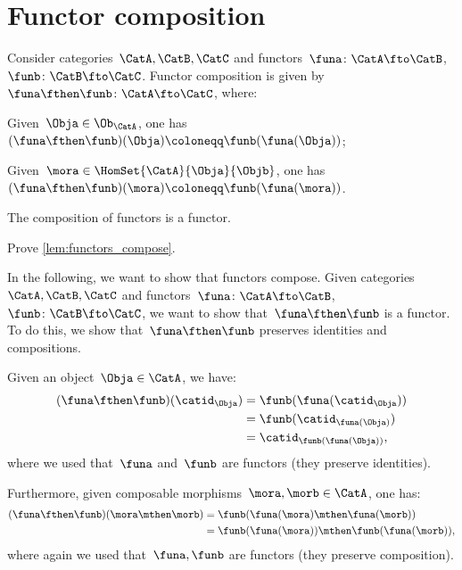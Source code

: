 \section{Functor composition}

\begin{ctdefinition}
  \label{def:functor_composition}
  Consider categories~$\CatA,\CatB,\CatC$ and functors~$\funa\colon \CatA\fto \CatB$,~$\funb \colon \CatB\fto \CatC$.
  Functor composition is given by~$\funa\fthen \funb\colon \CatA \fto \CatC$, where:
  \begin{compactitem}
    \item Given~$\Obja\in \Ob_\CatA$, one has~$(\funa\fthen \funb)(\Obja)\coloneqq\funb(\funa(\Obja))$;
    \item Given~$\mora \in \HomSet{\CatA}{\Obja}{\Objb}$, one has~$(\funa\fthen \funb)(\mora)\coloneqq \funb(\funa(\mora))$.
  \end{compactitem}
\end{ctdefinition}

\begin{lemma}
  \label{lem:functors_compose}
  The composition of functors is a functor.
\end{lemma}

\begin{exercise}
  Prove \cref{lem:functors_compose}.
\end{exercise}
\begin{solution}
  In the following, we want to show that functors compose.
Given categories~$\CatA,\CatB,\CatC$ and functors~$\funa\colon \CatA\fto \CatB$,~$\funb \colon \CatB\fto \CatC$, we want to show that~$\funa\fthen\funb$ is a functor.
  To do this, we show that~$\funa\fthen\funb$ preserves identities and compositions.
\begin{compactitem}
  \item Given an object~$\Obja\in \CatA$, we have:
  \begin{equation*}
    \begin{aligned}
    (\funa\fthen\funb)(\catid_\Obja)
      &=\funb(\funa(\catid_\Obja))\\
      &=\funb(\catid_{\funa(\Obja)})\\
      &=\catid_{\funb(\funa(\Obja))},
    \end{aligned}
  \end{equation*}
  where we used that~$\funa$ and~$\funb$ are functors (they preserve identities).
  \item Furthermore, given composable morphisms~$\mora,\morb\in \CatA$, one has:
  \begin{equation*}
    \begin{aligned}
    (\funa\fthen\funb)(\mora\mthen\morb)
      &=\funb(\funa(\mora)\mthen \funa(\morb))\\
      &=\funb(\funa(\mora))\mthen \funb(\funa(\morb)),
    \end{aligned}
  \end{equation*}
  where again we used that~$\funa,\funb$ are functors (they preserve composition).
\end{compactitem}
\end{solution}


